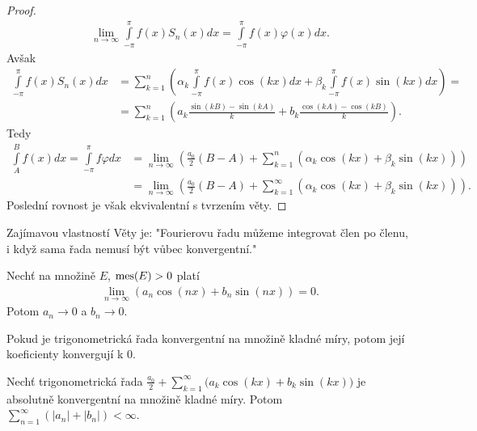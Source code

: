 \begin{theorem}
\begin{proof}
\begin{align*}
\lim_{n \rightarrow \infty} \int \limits_{-\pi}^\pi f(x) S_n (x) dx = \int \limits_{-\pi}^\pi f(x) \varphi (x) dx.
\end{align*}
Avšak
\begin{align*}
\int \limits_{-\pi}^\pi f(x) S_n (x) dx &= \sum \limits _{k=1}^n \left( \alpha_k \int \limits_{-\pi}^\pi f(x) \cos (kx) dx + \beta_k \int \limits_{-\pi}^\pi f(x) \sin (kx) dx \right) =\\
&= \sum \limits _{k=1}^n \left( a_k \frac{\sin (kB) - \sin (kA)}{k} + b_k \frac{\cos (kA) - \cos (kB)}{k} \right).
\end{align*}
Tedy
\begin{align*}
\int \limits_A^B f(x) dx = \int \limits_{-\pi}^\pi f \varphi dx &= \lim_{n \rightarrow \infty} \left( \frac{a_0}{2} (B-A) +  \sum \limits _{k=1}^n (\alpha_k \cos (kx) + \beta_k \sin (kx)) \right)\\ 
&= \lim_{n \rightarrow \infty} \left( \frac{a_0}{2} (B-A) +  \sum \limits _{k=1}^{\infty} (\alpha_k \cos (kx) + \beta_k \sin (kx)) \right).
\end{align*}
Poslední rovnost je však ekvivalentní s tvrzením věty.
\end{proof}
\end{theorem}

\begin{poznamka}\label{p_4.28}
Zajímavou vlastností Věty je: "Fourierovu řadu můžeme integrovat člen po členu, i když sama řada nemusí být vůbec konvergentní."
\end{poznamka}

\begin{theorem}\label{v_4.27}
Nechť na množině $E$, $\operatorname{mes}(E) > 0$ platí
\begin{align*}
\lim_{n \rightarrow \infty} (a_n \cos (nx) + b_n \sin (nx)) = 0.
\end{align*}
Potom $a_n \rightarrow 0$ a $b_n \rightarrow 0$.
\end{theorem}

\begin{dusledek}\label{d_4.28}
Pokud je trigonometrická řada konvergentní na množině kladné míry, potom její koeficienty konvergují k $0$.
\end{dusledek}

\begin{theorem}\label{v_4.29_Luzin-Denjoy}
Nechť trigonometrická řada $\frac{a_0}{2} + \sum \limits _{k=1}^\infty \Big(a_k \cos (kx) + b_k \sin (kx)\Big)$ je absolutně konvergentní na množině kladné míry. Potom $\sum \limits _{n=1}^\infty (|a_n| + |b_n|) < \infty$.
\end{theorem}



